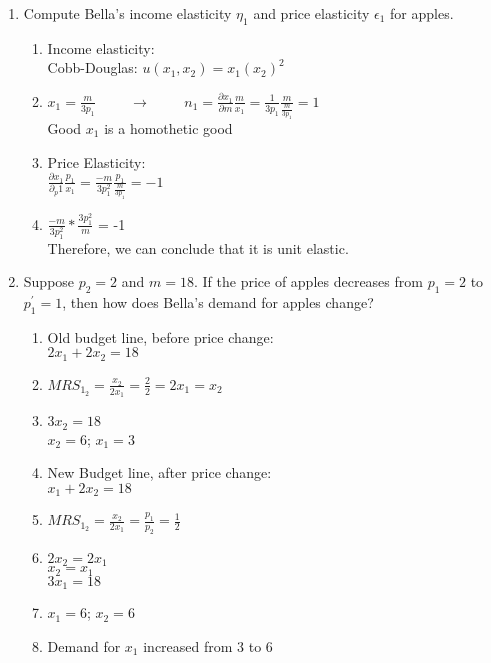\documentclass[11pt]{article}
\begin{document}
\begin{enumerate}
\begin{enumerate}
        \item Compute Bella's income elasticity $\eta_{1}$ and price elasticity $\epsilon_{1}$ for apples.
        \begin{enumerate}
            \item Income elasticity: \\
            Cobb-Douglas: $u(x_{1},x_{2}) = x_1(x_2)^2$
            \item $x_1 = \frac{m}{3p_1} \hspace{1cm} \rightarrow \hspace{1cm} n_1 = \frac{\partial x_1}{\partial m} \frac{m}{x_1} = \frac{1}{3p_1} \frac{m}{\frac{m}{3p_1}} = 1$\\
            Good $x_1$ is a homothetic good
            \item Price Elasticity:\\
            $\frac{\partial x_1}{\partial_p1} \frac{p_1}{x_1} = \frac{-m}{3p_1^2} \frac{p_1}{\frac{m}{3p_1}} = -1$
            \item $\frac{-m}{3p_1^2}*\frac{3p_1^2}{m}$ = -1\\
            Therefore, we can conclude that it is unit elastic.
        \end{enumerate}

        \item Suppose $p_{2}=2$ and $m=18$. If the price of apples decreases from $p_{1}=2$ to $p_{1}^{\prime}=1$, then how does Bella's demand for apples change?
        \begin{enumerate}
            \item Old budget line, before price change:\\
            $2x_1 + 2x_2 = 18$
            \item $MRS_1_2 = \frac{x_2}{2x_1}=\frac{2}{2}=2x_1 = x_2$
            \item $3x_2 = 18$\\
            $x_2 = 6$; $x_1 = 3$
            \item New Budget line, after price change:\\
            $x_1 + 2x_2 = 18$
            \item $MRS_1_2 = \frac{x_2}{2x_1}=\frac{p_1}{p_2}=\frac{1}{2}$
            \item $2x_2 = 2x_1$\\$x_2 = x_1$\\
            $3x_1 = 18$
            \item $x_1 = 6$; $x_2 = 6$
            \item Demand for $x_1$ increased from 3 to 6
        \end{enumerate}


\end{enumerate}
\end{enumerate}
\end{document}
